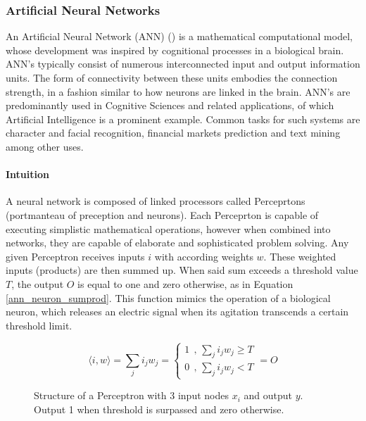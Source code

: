 \subsubsection{Artificial Neural Networks}
	\label{ann}
	An Artificial Neural Network (ANN) (\cite{mcculloch1943logical}) is a mathematical computational model, whose development was inspired by cognitional processes in a biological brain. ANN's typically consist of numerous interconnected input and output information units. The form of connectivity between these units embodies the connection strength, in a fashion similar to how neurons are linked in the brain. ANN's are predominantly used in Cognitive Sciences and related applications, of which Artificial Intelligence is a prominent example. Common tasks for such systems are character and facial recognition, financial markets prediction and text mining among other uses.
	
	\paragraph{Intuition}
		A neural network is composed of linked processors called Perceprtons (portmanteau of preception and neurons). Each Perceprton is capable of executing simplistic mathematical operations, however when combined into networks, they are capable of elaborate and sophisticated problem solving. Any given Perceptron receives inputs $ i $ with according weights $ w $. These weighted inputs (products) are then summed up. When said sum exceeds a threshold value $ T $, the output $ O $ is equal to one and zero otherwise, as in Equation \ref{ann_neuron_sumprod}. This function mimics the operation of a biological neuron, which releases an electric signal when its agitation transcends a certain threshold limit.
	
	\begin{equation}
		\langle i,w \rangle = \sum_j i_j w_j = 
			\begin{cases}
				1 \ \ \text{,  } \sum_j i_j w_j \geq T \\
				0 \ \ \text{,  } \sum_j i_j w_j < T 
			\end{cases}
		 = O
		\label{ann_neuron_sumprod}
	\end{equation}
	
	\begin{figure}[h]
		\centering
		\captionsetup{width=0.8\textwidth}
		
		\caption[ANN Perceptron]{
			\footnotesize{
				Structure of a Perceptron with 3 input nodes $ x_i $ and output $ y $. Output 1 when threshold is surpassed and zero otherwise.
			}
		} 
		\label{ANN_percept}
	\end{figure}
	
